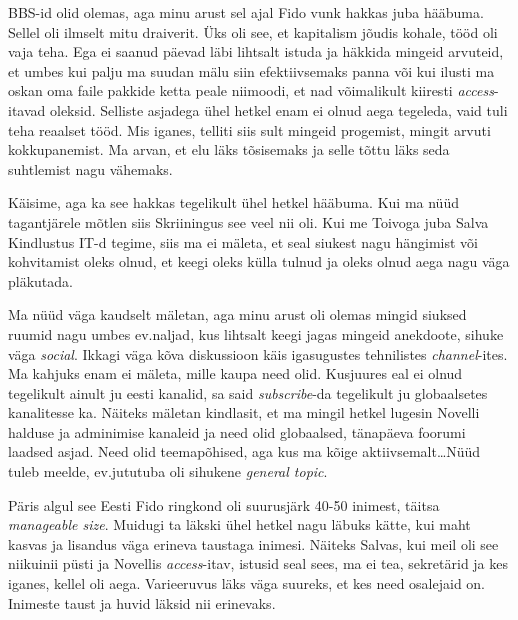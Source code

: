 
BBS-id olid olemas, aga minu arust sel ajal Fido vunk hakkas juba hääbuma. Sellel oli ilmselt mitu draiverit. Üks oli see, et kapitalism jõudis kohale, tööd oli vaja teha. Ega ei saanud päevad läbi lihtsalt istuda ja häkkida mingeid arvuteid, et umbes kui palju ma suudan mälu siin efektiivsemaks panna või kui ilusti ma oskan oma faile pakkide ketta peale niimoodi, et nad võimalikult kiiresti \emph{access}-itavad oleksid. Selliste asjadega ühel hetkel enam ei olnud aega tegeleda, vaid tuli teha reaalset tööd. Mis iganes, telliti siis sult mingeid progemist, mingit arvuti kokkupanemist. Ma arvan, et  elu läks  tõsisemaks ja selle tõttu läks seda suhtlemist nagu vähemaks. 


Käisime, aga ka see hakkas tegelikult ühel hetkel hääbuma. Kui ma nüüd tagantjärele mõtlen siis Skriiningus see veel nii oli. Kui me Toivoga juba Salva Kindlustus IT-d tegime, siis ma ei mäleta, et seal siukest nagu hängimist või kohvitamist oleks olnud, et keegi oleks külla tulnud ja oleks olnud aega nagu väga pläkutada. 


Ma nüüd väga kaudselt mäletan, aga minu arust oli olemas mingid siuksed ruumid nagu umbes ev.naljad, kus lihtsalt keegi jagas mingeid anekdoote, sihuke väga \emph{social}. Ikkagi väga kõva diskussioon käis igasugustes tehnilistes \emph{channel}-ites. Ma kahjuks enam ei mäleta, mille kaupa need olid. Kusjuures eal ei olnud tegelikult ainult ju eesti kanalid, sa said \emph{subscribe}-da tegelikult ju globaalsetes kanalitesse ka. Näiteks mäletan kindlasit, et  ma mingil hetkel lugesin  Novelli halduse ja adminimise kanaleid ja need olid  globaalsed,  tänapäeva foorumi laadsed asjad. Need olid teemapõhised, aga kus ma kõige aktiivsemalt\ldots Nüüd tuleb meelde, ev.jututuba  oli sihukene \emph{general topic}. 

Päris algul see Eesti Fido ringkond oli suurusjärk 40-50 inimest, täitsa \emph{manageable size}. Muidugi ta läkski ühel hetkel nagu läbuks kätte, kui maht kasvas ja lisandus väga erineva taustaga inimesi. Näiteks Salvas, kui meil oli see niikuinii püsti ja Novellis \emph{access}-itav, istusid seal sees, ma ei tea, sekretärid ja kes iganes, kellel oli aega. Varieeruvus läks väga suureks, et kes need osalejaid on. Inimeste taust ja huvid läksid nii erinevaks. 

